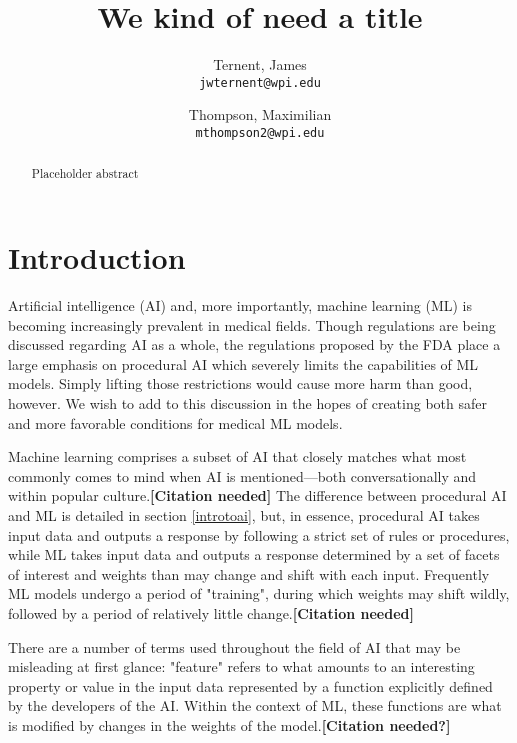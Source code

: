 \documentclass[]{article}
\title{We kind of need a title}
\author{
  Ternent, James\\
  \texttt{jwternent@wpi.edu}
  \and
  Thompson, Maximilian\\
  \texttt{mthompson2@wpi.edu}
}
\begin{document}
	
	\maketitle
	
	\begin{abstract}
		Placeholder abstract
	\end{abstract}
	
	\section{Introduction}
	
		Artificial intelligence (AI) and, more importantly, machine learning (ML) is becoming increasingly prevalent in medical fields. Though regulations are being discussed regarding AI as a whole, the regulations proposed by the FDA\cite{} place a large emphasis on procedural AI which severely limits the capabilities of ML models. Simply lifting those restrictions would cause more harm than good, however. We wish to add to this discussion in the hopes of creating both safer and more favorable conditions for medical ML models.

		Machine learning comprises a subset of AI that closely matches what most commonly comes to mind when AI is mentioned---both conversationally and within popular culture.\textbf{[Citation needed]} The difference between procedural AI and ML is detailed in section \ref{introtoai}, but, in essence, procedural AI takes input data and outputs a response by following a strict set of rules or procedures, while ML takes input data and outputs a response determined by a set of facets of interest and weights than may change and shift with each input. Frequently ML models undergo a period of "training", during which weights may shift wildly, followed by a period of relatively little change.\textbf{[Citation needed]}

		There are a number of terms used throughout the field of AI that may be misleading at first glance: "feature" refers to what amounts to an interesting property or value in the input data represented by a function explicitly defined by the developers of the AI. Within the context of ML, these functions are what is modified by changes in the weights of the model.\textbf{[Citation needed?]}
		
\end{document}

